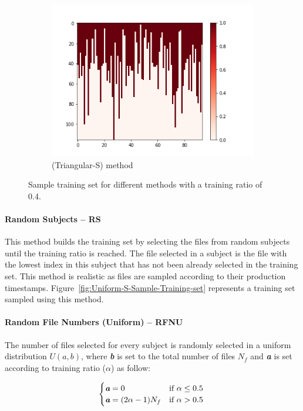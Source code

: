 \documentclass[10pt, conference, compsocconf]{IEEEtran}
\begin{document}
\begin{figure}[h!]
\begin{subfigure}[b]{0.4\linewidth}
  		\includegraphics[width=\columnwidth]{figures/5vs7_random-triangular-smallest_04_training}
  		\caption{(Triangular-S) method}
  		\label{fig:triangular-S-Sample-Training-set}
	\end{subfigure}
	\caption{Sample training set for different methods with a training ratio of 0.4.}		
\end{figure}

\paragraph{Random Subjects -- RS} This method builds the 
training set by selecting the files from random subjects 
until the training ratio is reached. The file selected in a 
subject is the file with the lowest index in this subject that has not 
been already selected in the training set. This method is realistic as 
files are sampled according to their production timestamps. 
Figure~\ref{fig:Uniform-S-Sample-Training-set} represents a training 
set sampled using this method.

\paragraph{Random File Numbers (Uniform) -- RFNU}

The number of files selected for every subject is randomly selected in
a uniform distribution $U(\textit{a},\textit{b})$, where \textit{\textbf{b}} is set to the total
number of files $N_{f}$ and \textit{\textbf{a}} is set according to training ratio ($\alpha$) as follow:

\[
  \begin{cases}
          \textit{\textbf{a}} = 0      & \text{if $\alpha \leq 0.5$ }\\
          
          \textit{\textbf{a}} = (2\alpha - 1) N_{f} & \text{if $\alpha > 0.5$}
  \end{cases}
\]
\end{document}
